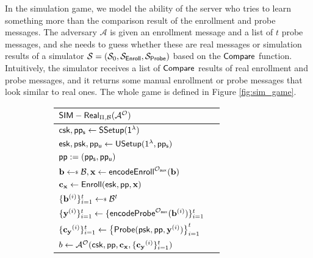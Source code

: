 In the simulation game, we model the ability of the server who tries to learn something more than the comparison result of the enrollment and probe messages. The adversary $\mathcal{A}$ is given an enrollment message and a list of $t$ probe messages, and she needs to guess whether these are real messages or simulation results of a simulator $\mathcal{S} = (\mathcal{S}_0, \mathcal{S}_{\sf Enroll}, \mathcal{S}_{\sf Probe})$ based on the $\sf Compare$ function. Intuitively, the simulator receives a list of $\sf Compare$ results of real enrollment and probe messages, and it returns some manual enrollment or probe messages that look similar to real ones. The whole game is defined in Figure \ref{fig:sim_game}.

\begin{figure}[h]
	\begin{center}

		\begin{subfigure}[t]{0.49\textwidth}
		\begin{tabular}{l c}
			${\sf SIM-Real}_{\Pi, \mathcal{B}}(\mathcal{A}^\mathcal{O})$\\

			\hline

			${\sf csk}, {\sf pp_s} \gets {\sf SSetup(1^\lambda)}$ \\

			${\sf esk}, {\sf psk}, {\sf pp_u} \gets {\sf USetup}(1^\lambda, {\sf pp_s})$ \\

			${\sf pp}:= ({\sf pp_s}, {\sf pp_u})$ \\
			
			$ \mathbf{b} \getsdollar \mathcal{B}, \mathbf{x} \gets {\sf encodeEnroll}^{\mathcal{O}_{\sf aux}}(\mathbf{b})$ \\

			$\mathbf{c_x} \gets {\sf Enroll}({\sf esk}, {\sf pp}, \mathbf{x})$ \\

			$\{ \mathbf{b}^{(i)} \}_{i=1}^t \getsdollar \mathcal{B}^t$ \\ 

			$\{\mathbf{y}^{(i)}\}_{i=1}^t \gets \{{\sf encodeProbe}^{\mathcal{O}_{\sf aux}}(\mathbf{b}^{(i)})\}_{i=1}^t $ \\
			
			$\{ \mathbf{c_y}^{(i)} \}_{i=1}^t \gets \left\{ {\sf Probe}( {\sf psk}, {\sf pp}, \mathbf{y}^{(i)} ) \right \}_{i=1}^t$ \\

			$b \gets \mathcal{A}^{\mathcal{O}} ({\sf csk}, {\sf pp}, \mathbf{c_x}, \{\mathbf{c_y}^{(i)}\}_{i=1}^t )$ \\


\end{tabular}
\end{subfigure}
\end{center}
\end{figure}
